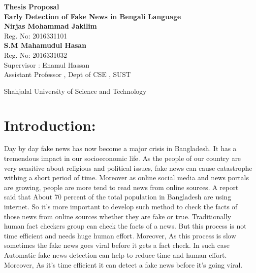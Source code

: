 \documentclass{article}
\begin{document}
	\begin{center}
    
    
		\LARGE{\textbf{Thesis Proposal}} \\
        \vspace{1em}
        \LARGE{\textbf{Early Detection of Fake News in Bengali Language}} \\
        \vspace{1em}
           \vspace{1em}
              \vspace{1em}
        \normalsize\textbf{Nirjas Mohammad Jakilim} \\
        \normalsize{Reg. No: 2016331101} \\
        \normalsize\textbf{S.M Mahamudul Hasan} \\
        \normalsize{Reg. No: 2016331032} \\
        \vspace{1em}
          \vspace{1em}
        \normalsize{Supervisor : Enamul Hassan} \\
        \normalsize{Assistant Professor , Dept of CSE , SUST }\\

        \vspace{1em}
        
        \normalsize{Shahjalal University  of Science and Technology} \\
       
     
	\end{center}
    
    
    	\section{Introduction:}
    	
          Day by day fake news has now become a major crisis in Bangladesh. It has a tremendous impact in our socioeconomic life. As the people of our country are very sensitive about religious and political issues, fake news can cause catastrophe withing a short period of time. Moreover as online social media and news portals are growing, people are more tend to read news from online sources. A report said that About 70 percent of the total population in Bangladesh are using internet. So it's more important to develop such method to check the facts of those news from online sources whether they are fake or true. Traditionally human fact checkers group can check the facts of a news. But this process is not time efficient and needs huge human effort. Moreover, As this process is slow sometimes the fake news goes viral before it gets a fact check. In such case Automatic fake news detection can help to reduce time and human effort. Moreover, As it's time efficient it can detect a fake news before it's going viral.
        
\end{document}
